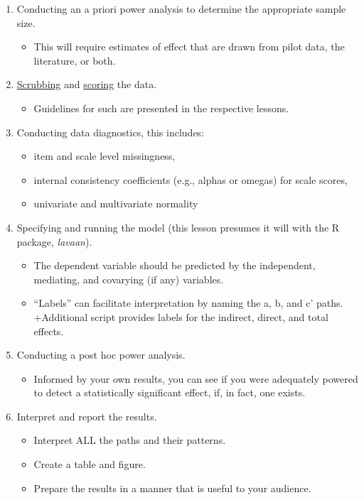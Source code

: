 \documentclass[
  11pt,
]{book}
\providecommand{\tightlist}{%
  \setlength{\itemsep}{0pt}\setlength{\parskip}{0pt}}
\begin{document}
\begin{enumerate}
\def\labelenumi{\arabic{enumi}.}
\tightlist
\item
  Conducting an a priori power analysis to determine the appropriate sample size.

  \begin{itemize}
  \tightlist
  \item
    This will require estimates of effect that are drawn from pilot data, the literature, or both.
  \end{itemize}
\item
  \href{https://lhbikos.github.io/ReC_MultivModel/scrub.html}{Scrubbing} and \href{https://lhbikos.github.io/ReC_MultivModel/score.html}{scoring} the data.

  \begin{itemize}
  \tightlist
  \item
    Guidelines for such are presented in the respective lessons.
  \end{itemize}
\item
  Conducting data diagnostics, this includes:

  \begin{itemize}
  \tightlist
  \item
    item and scale level missingness,
  \item
    internal consistency coefficients (e.g., alphas or omegas) for scale scores,
  \item
    univariate and multivariate normality
  \end{itemize}
\item
  Specifying and running the model (this lesson presumes it will with the R package, \emph{lavaan}).

  \begin{itemize}
  \tightlist
  \item
    The dependent variable should be predicted by the independent, mediating, and covarying (if any) variables.
  \item
    ``Labels'' can facilitate interpretation by naming the a, b, and c' paths. +Additional script provides labels for the indirect, direct, and total effects.
  \end{itemize}
\item
  Conducting a post hoc power analysis.

  \begin{itemize}
  \tightlist
  \item
    Informed by your own results, you can see if you were adequately powered to detect a statistically significant effect, if, in fact, one exists.
  \end{itemize}
\item
  Interpret and report the results.

  \begin{itemize}
  \tightlist
  \item
    Interpret ALL the paths and their patterns.
  \item
    Create a table and figure.
  \item
    Prepare the results in a manner that is useful to your audience.
  \end{itemize}
\end{enumerate}
\end{document}
